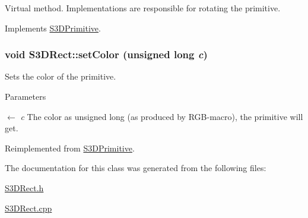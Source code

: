 Virtual method. Implementations are responsible for rotating the primitive. 



Implements \hyperlink{class_s3_d_primitive_a23eb36b6bd48643e8f7be4b950592d9e}{S3DPrimitive}.

\hypertarget{class_s3_d_rect_af1a976fbe476e7096b2ceded7ab1659c}{
\subsubsection[{setColor}]{\setlength{\rightskip}{0pt plus 5cm}void S3DRect::setColor (unsigned long {\em c})}}
\label{class_s3_d_rect_af1a976fbe476e7096b2ceded7ab1659c}


Sets the color of the primitive. 


\begin{DoxyParams}{Parameters}
\item[\mbox{$\leftarrow$} {\em c}]The color as unsigned long (as produced by RGB-\/macro), the primitive will get. \end{DoxyParams}


Reimplemented from \hyperlink{class_s3_d_primitive_a1c8f036193987522bdfb6a49b9b74000}{S3DPrimitive}.



The documentation for this class was generated from the following files:\begin{DoxyCompactItemize}
\item 
\hyperlink{_s3_d_rect_8h}{S3DRect.h}\item 
\hyperlink{_s3_d_rect_8cpp}{S3DRect.cpp}\end{DoxyCompactItemize}
